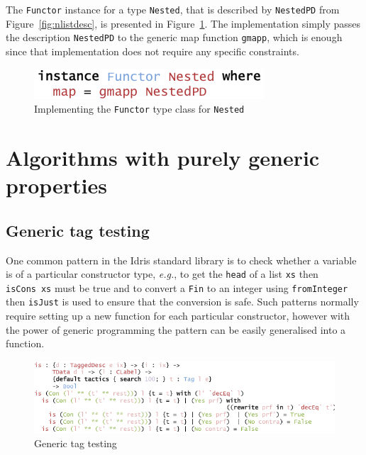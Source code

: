 \documentclass{ituthesis}
\newcommand{\tttype}[1]{\textcolor{type-color}{\texttt{#1}}}
\newcommand{\ttdec}[1]{\textcolor{declared-var-color}{\texttt{#1}}}
\newcommand{\ttvar}[1]{\textcolor{local-var-color}{\texttt{#1}}}
\theoremstyle{break}
\begin{document}
The \tttype{Functor} instance for a type \ttdec{Nested}, that is described by \ttdec{NestedPD} from Figure~\ref{fig:nlistdesc}, is presented in Figure~\ref{fig:functorinst}.
The implementation simply passes the description \ttdec{NestedPD} to the generic map function \ttdec{gmapp}, which is enough since that implementation does not require any specific constraints.

\begin{figure}[ht]
\begin{center}
    \includegraphics[scale=0.5]{Figures/GenericFunctorInstance.png}
\end{center}
\caption{Implementing the \tttype{Functor} type class for \ttdec{Nested}}
\label{fig:functorinst}
\end{figure}

\section{Algorithms with purely generic properties}
\label{sec:Algorithms with purely generic properties}
\subsection{Generic tag testing}
\label{sub:Generic tag testing}
One common pattern in the Idris standard library is to check whether a variable is of a particular constructor type, \textit{e.g.},
to get the \ttdec{head} of a list \ttvar{xs} then \ttdec{isCons}~\ttvar{xs} must be true and to convert a \tttype{Fin} to an integer using \ttdec{fromInteger} then \ttdec{isJust} is used to ensure that the conversion is safe.
Such patterns normally require setting up a new function for each particular constructor, however with the power of generic programming the pattern can be easily generalised into a function.

\begin{figure}[ht]
\begin{center}
    \includegraphics[scale=0.5]{Figures/GenericIs.png}
\end{center}
\caption{Generic tag testing}
\label{fig:isgen}
\end{figure}
\end{document}

